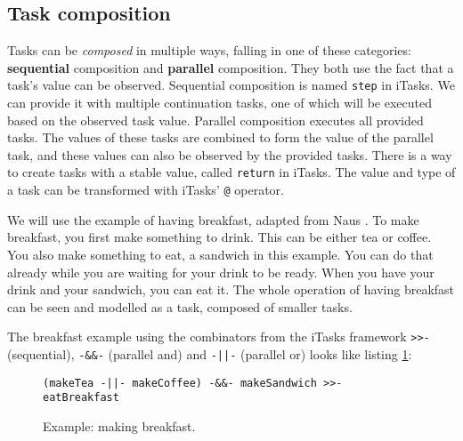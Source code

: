 \subsection{Task composition}\label{section-top-composition}
Tasks can be \textit{composed} in multiple ways, falling in one of these categories: \textbf{sequential} composition and \textbf{parallel} composition. They both use the fact that a task's value can be observed.
Sequential composition is named \texttt{step} in iTasks. We can provide it with multiple continuation tasks, one of which will be executed based on the observed task value.
Parallel composition executes all provided tasks. The values of these tasks are combined to form the value of the parallel task, and these values can also be observed by the provided tasks.
There is a way to create tasks with a stable value, called \texttt{return} in iTasks. The value and type of a task can be transformed with iTasks' \texttt{@} operator.


We will use the example of having breakfast, adapted from Naus \cite{naus2020assisting}. To make breakfast, you first make something to drink. This can be either tea or coffee. You also make something to eat, a sandwich in this example. You can do that already while you are waiting for your drink to be ready. When you have your drink and your sandwich, you can eat it. The whole operation of having breakfast can be seen and modelled as a task, composed of smaller tasks.

The breakfast example using the combinators from the iTasks framework \texttt{>>-} (sequential), \texttt{-&&-} (parallel and) and \texttt{-||-} (parallel or) looks like listing \ref{lst:clean_breakfast}:

\begin{figure}[ht]
\centering
\begin{verbatim}
(makeTea -||- makeCoffee) -&&- makeSandwich >>- eatBreakfast
\end{verbatim}
\caption{Example: making breakfast.}
\label{lst:clean_breakfast}
\end{figure}


